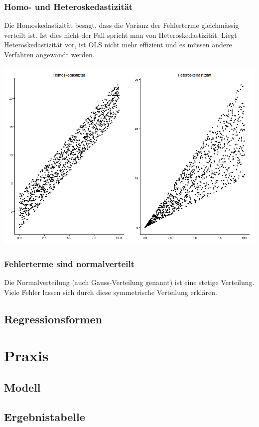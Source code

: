 \documentclass[10pt,a4paper]{article}
\begin{document}
        \subsubsection{Homo- und Heteroskedastizität}
        Die Homoskedastizität besagt, dass die Varianz der Fehlerterme gleichmässig verteilt ist. Ist dies nicht der Fall spricht man von Heteroskedastizität. Liegt Heteroskedastizität vor, ist OLS nicht mehr effizient und es müssen andere Verfahren angewandt werden.

        \includegraphics[max width=\textwidth]{../Plots/homo_heterosked.png}

        \subsubsection{Fehlerterme sind normalverteilt}
        Die Normalverteilung (auch Gauss-Verteilung genannt) ist eine stetige Verteilung. Viele Fehler lassen sich durch diese symmetrische Verteilung erklären.

        
    \subsection{Regressionsformen}
\section{Praxis}
    \subsection{Modell}
    \subsection{Ergebnistabelle}
\end{document}
